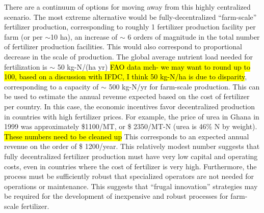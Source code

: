 There are a continuum of options for moving away from this highly centralized scenario. The most extreme alternative would be fully-decentralized ``farm-scale'' fertilizer production, corresponding to roughly 1 fertilizer production facility per farm (or per $\sim$10 ha), an increase of $\sim$ 6 orders of magnitude in the total number of fertilizer production facilities. This would also correspond to proportional decrease in the scale of production.
The global average nutrient load needed for fertilization is $\sim$ 50 kg-N/(ha yr) \needcite \hl{FAO data mch- we may want to round up to 100, based on a discussion with IFDC, I think 50 kg-N/ha is due to disparity}, 
corresponding to a capacity of $\sim$ 500 kg-N/yr for farm-scale production. This can be used to estimate the annual revenue expected based on the cost of fertilizer per country. 
In this case, the economic incentives favor decentralized production in countries with high fertilizer prices. 
For example, the price of urea in Ghana in 1999 was approximately \$1100/MT, or \$ 2350/MT-N (urea is 46\% N by weight). \hl{These numbers need to be cleaned up}
This corresponds to an expected annual revenue on the order of \$ 1200/year. This relatively modest number suggests that fully decentralized fertilizer production must have very low capital and operating costs, even in countries where the cost of fertilizer is very high. Furthermore, the process must be sufficiently robust that specialized operators are not needed for operations or maintenance. This suggests that ``frugal innovation'' strategies \cite{Weyrauch_2016} may be required for the development of inexpensive and robust processes for farm-scale fertilizer.

